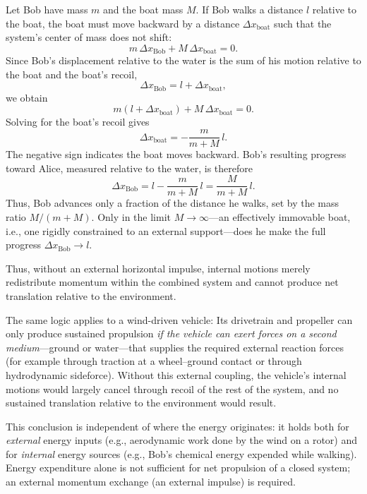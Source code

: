 \documentclass[reprint,aps,pra,longbibliography]{revtex4-2}
\begin{document}
Let Bob have mass $m$ and the boat mass $M$. If Bob walks a distance $l$ relative to the boat, the boat must move backward by a distance $\Delta x_\text{boat}$ such that the system's center of mass does not shift:
\begin{equation}
m\,\Delta x_\text{Bob} + M\,\Delta x_\text{boat} = 0.
\end{equation}
Since Bob's displacement relative to the water is the sum of his motion relative to the boat and the boat's recoil,
\begin{equation}
\Delta x_\text{Bob} = l + \Delta x_\text{boat},
\end{equation}
we obtain
\begin{equation}
m(l + \Delta x_\text{boat}) + M\,\Delta x_\text{boat} = 0.
\end{equation}
Solving for the boat's recoil gives
\begin{equation}
\Delta x_\text{boat} = -\frac{m}{m+M}\,l.
\end{equation}
The negative sign indicates the boat moves backward. Bob's resulting progress toward Alice, measured relative to the water, is therefore
\begin{equation}
\Delta x_\text{Bob} = l - \frac{m}{m+M}\,l = \frac{M}{m+M}\,l.
\end{equation}
Thus, Bob advances only a fraction of the distance he walks, set by the mass ratio \(M/(m+M)\). Only in the limit \(M\to\infty\)---an effectively immovable boat, i.e., one rigidly constrained to an external support---does he make the full progress \(\Delta x_\text{Bob}\to l\).

Thus, without an external horizontal impulse, internal motions merely
redistribute momentum within the combined system and cannot produce net
translation relative to the environment.

The same logic applies to a wind-driven vehicle: Its drivetrain and propeller
can only produce sustained propulsion \emph{if the vehicle can exert forces on
a second medium}---ground or water---that supplies the required external
reaction forces (for example through traction at a wheel--ground contact or
through hydrodynamic sideforce). Without this external coupling, the vehicle's
internal motions would largely cancel through recoil of the rest of the system,
and no sustained translation relative to the environment would result.

This conclusion is independent of where the energy originates: it holds both
for \emph{external} energy inputs (e.g., aerodynamic work done by the wind on a
rotor) and for \emph{internal} energy sources (e.g., Bob's chemical energy
expended while walking). Energy expenditure alone is not sufficient for net
propulsion of a closed system; an external momentum exchange (an external
impulse) is required.
\end{document}
